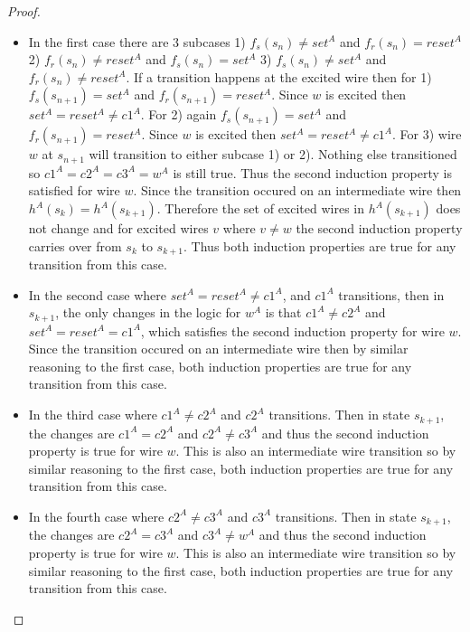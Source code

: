 \documentclass{article}
\begin{document}
\begin{proof}
\begin{itemize}
\item In the first case there are 3 subcases 1) $f_s(s_n)\neq set^A$ and $f_r(s_n)= reset^A$ 2) $f_r(s_n)\neq reset^A$ and $f_s(s_n)= set^A$ 3) $f_s(s_n)\neq set^A$ and $f_r(s_n)\neq reset^A$.  If a transition happens at the excited wire then for 1) $f_s(s_{n+1})= set^A$ and $f_r(s_{n+1})= reset^A$.  Since $w$ is excited then $set^A=reset^A\neq c1^A$.  For 2) again $f_s(s_{n+1})= set^A$ and $f_r(s_{n+1})= reset^A$.  Since $w$ is excited then $set^A=reset^A\neq c1^A$.  For 3) wire $w$ at $s_{n+1}$ will transition to either subcase 1) or 2).  Nothing else transitioned so $c1^A=c2^A=c3^A=w^A$ is still true.  Thus the second induction property is satisfied for wire $w$.  Since the transition occured on an intermediate wire then $h^A(s_k)=h^A(s_{k+1})$.  Therefore the set of excited wires in $h^A(s_{k+1})$ does not change and for excited wires $v$ where $v\neq w$ the second induction property carries over from $s_k$ to $s_{k+1}$.  Thus both induction properties are true for any transition from this case. 
\item
In the second case where $set^A=reset^A \neq c1^A$, and $c1^A$ transitions, then in $s_{k+1}$, the only changes in the logic for $w^A$ is that $c1^A\neq c2^A$ and $set^A=reset^A = c1^A$, which satisfies the second induction property for wire $w$.  Since the transition occured on an intermediate wire then by similar reasoning to the first case, both induction properties are true for any transition from this case. %
\item
In the third case where $c1^{A}\neq c2^{A}$ and $c2^A$ transitions.  Then in state $s_{k+1}$, the changes are $c1^A=c2^A$ and $c2^{A}\neq c3^{A}$ and thus the second induction property is true for wire $w$.  This is also an intermediate wire transition so by similar reasoning to the first case, both induction properties are true for any transition from this case.  
\item
In the fourth case where $c2^A \neq c3^A$ and $c3^A$ transitions.   Then in state $s_{k+1}$, the changes are $c2^{A}= c3^{A}$ and $c3^{A}\neq w^A$ and thus the second induction property is true for wire $w$.  This is also an intermediate wire transition so by similar reasoning to the first case, both induction properties are true for any transition from this case. 

\end{itemize}
\end{proof}
\end{document}
